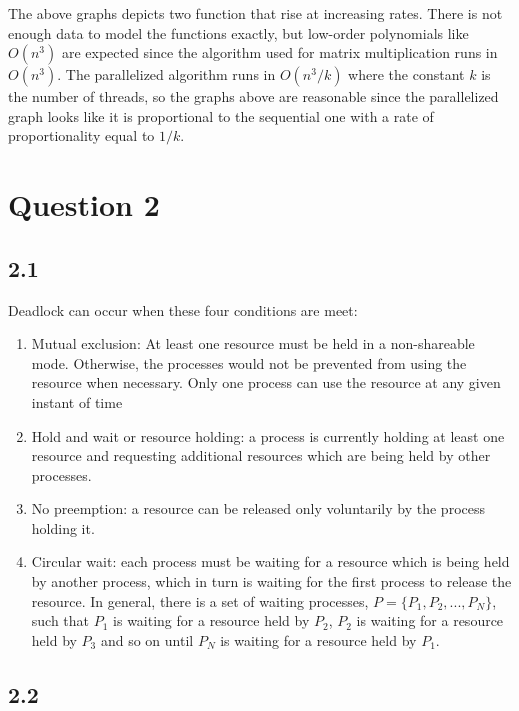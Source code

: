 \documentclass[11pt, letterpaper]{article}
\begin{document}
The above graphs depicts two function that rise at increasing rates. There is not enough data to
model the functions exactly, but low-order polynomials like $O(n^3)$ are expected since the algorithm
used for matrix multiplication runs in $O(n^3)$. The parallelized algorithm runs in $O(n^3/k)$ where
the constant $k$ is the number of threads, so the graphs above are reasonable since the parallelized
graph looks like it is proportional to the sequential one with a rate of proportionality equal to
$1/k$.

\pagebreak

\section*{Question 2}

\subsection*{2.1}

Deadlock can occur when these four conditions are meet:

\begin{enumerate}
    \item Mutual exclusion: At least one resource must be held in a non-shareable mode. Otherwise, the processes would not be prevented from using the resource when necessary. Only one process can use the resource at any given instant of time
    \item Hold and wait or resource holding: a process is currently holding at least one resource and requesting additional resources which are being held by other processes.
    \item No preemption: a resource can be released only voluntarily by the process holding it.
    \item Circular wait: each process must be waiting for a resource which is being held by another process, which in turn is waiting for the first process to release the resource. In general, there is a set of waiting processes, $P = \{P_1, P_2, ..., P_N\}$, such that $P_1$ is waiting for a resource held by $P_2$, $P_2$ is waiting for a resource held by $P_3$ and so on until $P_N$ is waiting for a resource held by $P_1$.
\end{enumerate}

\subsection*{2.2}
\end{document}
